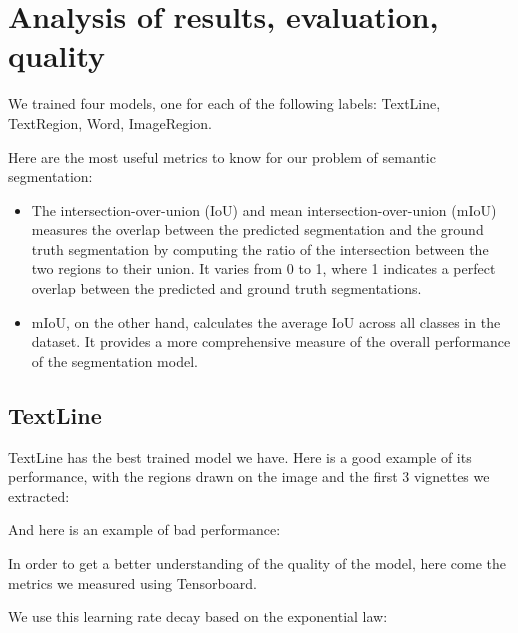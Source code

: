 \documentclass{polytech/polytech}
\numberwithin{figure}{chapter}
\begin{document}
\section{Analysis of results, evaluation, quality}

We trained four models, one for each of the following labels: TextLine, TextRegion, Word, ImageRegion.

Here are the most useful metrics to know for our problem of semantic segmentation:
\begin{itemize}
\item The intersection-over-union (IoU) and mean intersection-over-union (mIoU) measures the overlap between the predicted segmentation and the ground truth segmentation by computing the ratio of the intersection between the two regions to their union.
It varies from 0 to 1, where 1 indicates a perfect overlap between the predicted and ground truth segmentations.
\item mIoU, on the other hand, calculates the average IoU across all classes in the dataset.
It provides a more comprehensive measure of the overall performance of the segmentation model.
\end{itemize}

\subsection{TextLine}

TextLine has the best trained model we have. Here is a good example of its performance, with the regions drawn on the image and the first 3 vignettes we extracted:



And here is an example of bad performance:


In order to get a better understanding of the quality of the model, here come the metrics we measured using Tensorboard.


We use this learning rate decay based on the exponential law:
\end{document}
